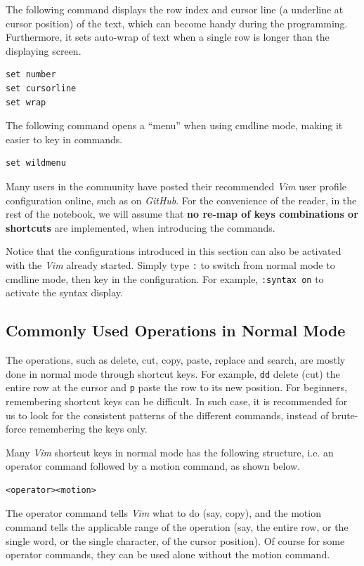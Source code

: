 The following command displays the row index and cursor line (a underline at cursor position) of the text, which can become handy during the programming. Furthermore, it sets auto-wrap of text when a single row is longer than the displaying screen.
\begin{verbatim}
set number
set cursorline
set wrap
\end{verbatim}

The following command opens a ``menu'' when using cmdline mode, making it easier to key in commands.
\begin{verbatim}
set wildmenu
\end{verbatim}

Many users in the community have posted their recommended \textit{Vim} user profile configuration online, such as on \textit{GitHub}. For the convenience of the reader, in the rest of the notebook, we will assume that \textbf{no re-map of keys combinations or shortcuts} are implemented, when introducing the commands.

Notice that the configurations introduced in this section can also be activated with the \textit{Vim} already started. Simply type \verb|:| to switch from normal mode to cmdline mode, then key in the configuration. For example, \verb|:syntax on| to activate the syntax display.

\subsection{Commonly Used Operations in Normal Mode}

The operations, such as delete, cut, copy, paste, replace and search, are mostly done in normal mode through shortcut keys. For example, \verb|dd| delete (cut) the entire row at the cursor and \verb|p| paste the row to its new position. For beginners, remembering shortcut keys can be difficult. In such case, it is recommended for us to look for the consistent patterns of the different commands, instead of brute-force remembering the keys only.

Many \textit{Vim} shortcut keys in normal mode has the following structure, i.e. an operator command followed by a motion command, as shown below.
\begin{verbatim}
<operator><motion>
\end{verbatim}
The operator command tells \textit{Vim} what to do (say, copy), and the motion command tells the applicable range of the operation (say, the entire row, or the single word, or the single character, of the cursor position). Of course for some operator commands, they can be used alone without the motion command.

